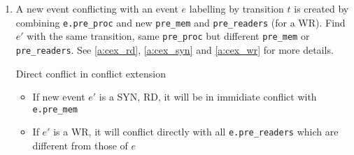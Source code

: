 \documentclass{llncs}
\begin{document}
\begin{enumerate}
\begin{algorithm}{}
\begin{enumerate}
			for each \verb!pre_readers[i]! $(i \in [0..numprocs])$,
			
			set \verb!parent = pre_readers[i]!
			
		\end{enumerate}
		Let's consider $parent$.
		
		\begin{itemize}
			\item
			\verb!parent->trans->type! is RD or SYN: 
			If found(e) in \verb!parent.post_rws!, then $this$ and $e$ are in direct
			conflict
			\item
			\verb!parent->trans->type! is WR: If found(this) and found(e) in the same 
			\verb!parent.post_mem[i]!, then they definitely
			conflict immediately.
		\end{itemize}
		\noindent
		\caption{Check direct conflict between two enabled events}
		\label{a:dicfl}
	\end{algorithm}
	
	\item
	A new event conflicting with an event $e$ labelling by transition $t$ is created by
	combining \verb!e.pre_proc! and new \verb!pre_mem! and \verb!pre_readers! (for a WR).
	Find $e'$ with the same transition, same \verb!pre_proc! but different \verb!pre_mem! or
	\verb!pre_readers!. See \cref{a:cex_rd}, \cref{a:cex_syn} and \cref{a:cex_wr} for more
	details.
	
	\begin{lemma}{Direct conflict in conflict extension}
		\begin{itemize}
			\item
			If new event $e'$ is a SYN, RD, it will be in immidiate conflict with \verb!e.pre_mem!
			\item
			If $e'$ is a WR, it will conflict directly with all \verb!e.pre_readers! which are
			different from those of $e$
		\end{itemize}
	\end{lemma}
	
\end{enumerate}
\end{document}
